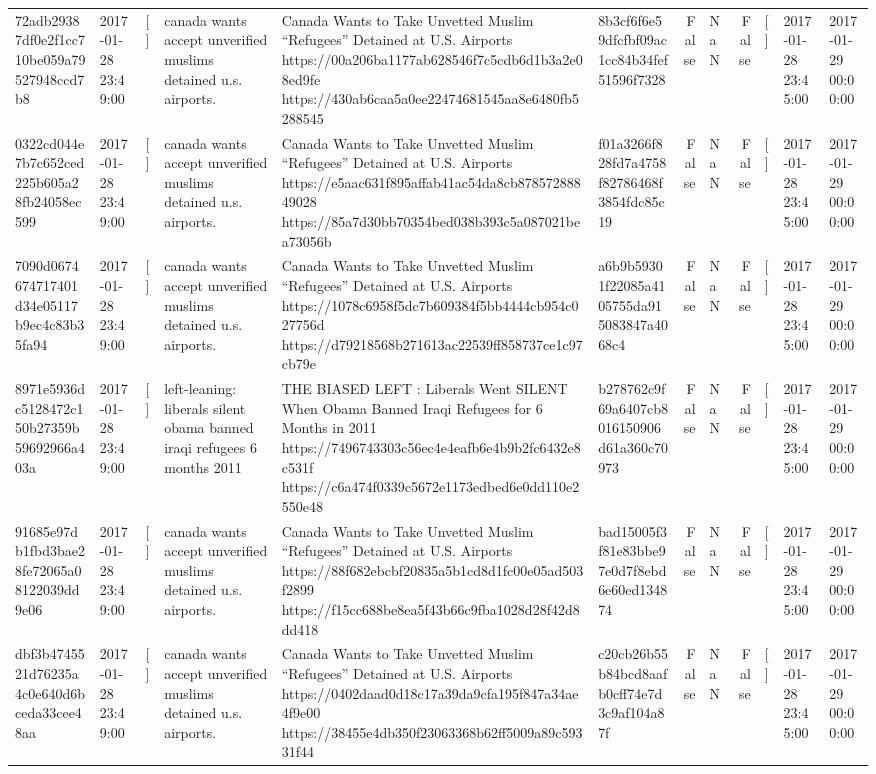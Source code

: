 \begin{tabular}{llllllrlrlll}
72adb29387df0e2f1cc710be059a79527948ccd7b8 & 2017-01-28 23:49:00 & [] & canada wants accept unverified muslims detained u.s. airports. & Canada Wants to Take Unvetted Muslim “Refugees” Detained at U.S. Airports https://00a206ba1177ab628546f7c5cdb6d1b3a2e08ed9fe https://430ab6caa5a0ee22474681545aa8e6480fb5288545 & 8b3cf6f6e59dfcfbf09ac1cc84b34fef51596f7328 & False & NaN & False & [] & 2017-01-28 23:45:00 & 2017-01-29 00:00:00 \\
0322cd044e7b7c652ced225b605a28fb24058ec599 & 2017-01-28 23:49:00 & [] & canada wants accept unverified muslims detained u.s. airports. & Canada Wants to Take Unvetted Muslim “Refugees” Detained at U.S. Airports https://e5aac631f895affab41ac54da8cb87857288849028 https://85a7d30bb70354bed038b393c5a087021bea73056b & f01a3266f828fd7a4758f82786468f3854fdc85c19 & False & NaN & False & [] & 2017-01-28 23:45:00 & 2017-01-29 00:00:00 \\
7090d0674674717401d34e05117b9ec4c83b35fa94 & 2017-01-28 23:49:00 & [] & canada wants accept unverified muslims detained u.s. airports. & Canada Wants to Take Unvetted Muslim “Refugees” Detained at U.S. Airports https://1078c6958f5dc7b609384f5bb4444cb954c027756d https://d79218568b271613ac22539ff858737ce1c97cb79e & a6b9b59301f22085a4105755da915083847a4068c4 & False & NaN & False & [] & 2017-01-28 23:45:00 & 2017-01-29 00:00:00 \\
8971e5936dc5128472c150b27359b59692966a403a & 2017-01-28 23:49:00 & [] & left-leaning: liberals silent obama banned iraqi refugees 6 months 2011 & THE BIASED LEFT : Liberals Went SILENT When Obama Banned Iraqi Refugees for 6 Months in 2011 https://7496743303c56ec4e4eafb6e4b9b2fc6432e8c531f https://c6a474f0339c5672e1173edbed6e0dd110e2550e48 & b278762c9f69a6407cb8016150906d61a360c70973 & False & NaN & False & [] & 2017-01-28 23:45:00 & 2017-01-29 00:00:00 \\
91685e97db1fbd3bae28fe72065a08122039dd9e06 & 2017-01-28 23:49:00 & [] & canada wants accept unverified muslims detained u.s. airports. & Canada Wants to Take Unvetted Muslim “Refugees” Detained at U.S. Airports https://88f682ebcbf20835a5b1cd8d1fc00e05ad503f2899 https://f15cc688be8ea5f43b66c9fba1028d28f42d8dd418 & bad15005f3f81e83bbe97e0d7f8ebd6e60ed134874 & False & NaN & False & [] & 2017-01-28 23:45:00 & 2017-01-29 00:00:00 \\
dbf3b4745521d76235a4c0e640d6bceda33cee48aa & 2017-01-28 23:49:00 & [] & canada wants accept unverified muslims detained u.s. airports. & Canada Wants to Take Unvetted Muslim “Refugees” Detained at U.S. Airports https://0402daad0d18c17a39da9cfa195f847a34ae4f9e00 https://38455e4db350f23063368b62ff5009a89c59331f44 & c20cb26b55b84bcd8aafb0cff74e7d3c9af104a87f & False & NaN & False & [] & 2017-01-28 23:45:00 & 2017-01-29 00:00:00 \\

\end{tabular}
